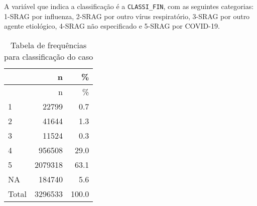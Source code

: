 \documentclass[
]{article}
\newenvironment{Shaded}{\begin{snugshade}}{\end{snugshade}}
\newcommand{\AttributeTok}[1]{\textcolor[rgb]{0.77,0.63,0.00}{#1}}
\newcommand{\CommentTok}[1]{\textcolor[rgb]{0.56,0.35,0.01}{\textit{#1}}}
\newcommand{\ConstantTok}[1]{\textcolor[rgb]{0.00,0.00,0.00}{#1}}
\newcommand{\DecValTok}[1]{\textcolor[rgb]{0.00,0.00,0.81}{#1}}
\newcommand{\FunctionTok}[1]{\textcolor[rgb]{0.00,0.00,0.00}{#1}}
\newcommand{\NormalTok}[1]{#1}
\newcommand{\OtherTok}[1]{\textcolor[rgb]{0.56,0.35,0.01}{#1}}
\newcommand{\SpecialCharTok}[1]{\textcolor[rgb]{0.00,0.00,0.00}{#1}}
\newcommand{\StringTok}[1]{\textcolor[rgb]{0.31,0.60,0.02}{#1}}
\begin{document}
A variável que indica a classificação é a \texttt{CLASSI\_FIN}, com as
seguintes categorias: 1-SRAG por influenza, 2-SRAG por outro vírus
respiratório, 3-SRAG por outro agente etiológico, 4-SRAG não
especificado e 5-SRAG por COVID-19.

\begin{Shaded}
\end{Shaded}

\begin{longtable}[]{@{}lrr@{}}
\caption{Tabela de frequências para classificação do
caso}\tabularnewline
\toprule
& n & \% \\
\midrule
\endfirsthead
\toprule
& n & \% \\
\midrule
\endhead
1 & 22799 & 0.7 \\
2 & 41644 & 1.3 \\
3 & 11524 & 0.3 \\
4 & 956508 & 29.0 \\
5 & 2079318 & 63.1 \\
NA & 184740 & 5.6 \\
Total & 3296533 & 100.0 \\
\bottomrule
\end{longtable}

\begin{Shaded}
\end{Shaded}
\end{document}
